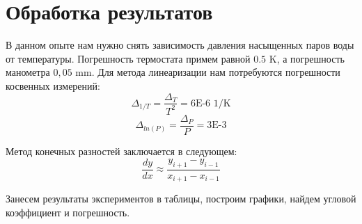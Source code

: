 \documentclass[12pt]{article}
\begin{document}
\section{Обработка результатов}

В данном опыте нам нужно снять зависимость давления насыщенных паров воды от температуры. Погрешность термостата примем равной $0.5$ K, а погрешность манометра $0,05$ mm.
Для метода линеаризации нам потребуются погрешности косвенных измерений:
\begin{equation*}
	\Delta_{1/T} = \frac{\Delta_T}{T^2} = 6\text{E-6 1/K}
\end{equation*}
\begin{equation*}
\Delta_{ln(P)} = \frac{\Delta_P}{P} = 3\text{E-3}
\end{equation*}

Метод конечных разностей заключается в следующем:
\begin{equation*}
	\frac{dy}{dx} \approx \frac{y_{i+1} - y_{i-1}}{x_{i+1} - x_{i-1}}
\end{equation*}

Занесем результаты экспериментов в таблицы, построим графики, найдем угловой коэффициент и погрешность.
\end{document}
